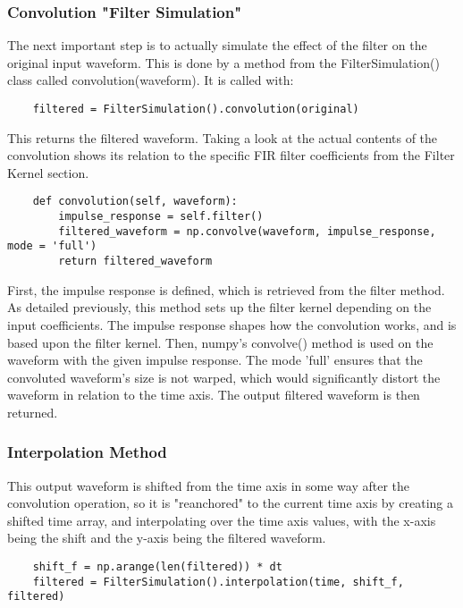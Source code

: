 \documentclass[11pt, a4paper]{article}
\theoremstyle{definition}
\numberwithin{equation}{section}
\begin{document}
\subsubsection{Convolution "Filter Simulation"}

The next important step is to actually simulate the effect of the filter on the original input waveform. This is done by a method from the FilterSimulation() class called convolution(waveform). It is called with:

\begin{verbatim}
    filtered = FilterSimulation().convolution(original)
\end{verbatim}

This returns the filtered waveform. Taking a look at the actual contents of the convolution shows its relation to the specific FIR filter coefficients from the Filter Kernel section.

\begin{verbatim}
    def convolution(self, waveform):
        impulse_response = self.filter()
        filtered_waveform = np.convolve(waveform, impulse_response, mode = 'full')
        return filtered_waveform
\end{verbatim}

First, the impulse response is defined, which is retrieved from the filter method. As detailed previously, this method sets up the filter kernel depending on the input coefficients. The impulse response shapes how the convolution works, and is based upon the filter kernel. Then, numpy's convolve() method is used on the waveform with the given impulse response. The mode 'full' ensures that the convoluted waveform's size is not warped, which would significantly distort the waveform in relation to the time axis. The output filtered waveform is then returned.

\subsubsection{Interpolation Method}

This output waveform is shifted from the time axis in some way after the convolution operation, so it is "reanchored" to the current time axis by creating a shifted time array, and interpolating over the time axis values, with the x-axis being the shift and the y-axis being the filtered waveform.

\begin{verbatim}
    shift_f = np.arange(len(filtered)) * dt
    filtered = FilterSimulation().interpolation(time, shift_f, filtered)
\end{verbatim}
\end{document}
